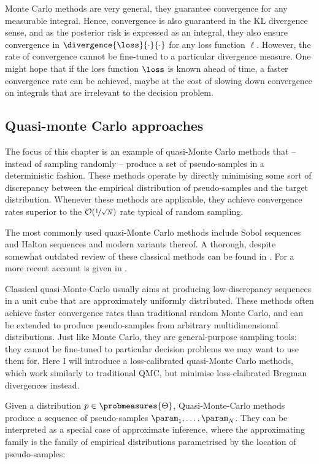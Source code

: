 Monte Carlo methods are very general, they guarantee convergence for any measurable integral. Hence, convergence is also guaranteed in the KL divergence sense, and as the posterior risk is expressed as an integral, they also ensure convergence in $\divergence{\loss}{\cdot}{\cdot}$ for any loss function $\ell$. However, the rate of convergence cannot be fine-tuned to a particular divergence measure. One might hope that if the loss function $\loss$ is known ahead of time, a faster convergence rate can be achieved, maybe at the cost of slowing down convergence on integrals that are irrelevant to the decision problem.

\subsection{Quasi-monte Carlo approaches}

The focus of this chapter is an example of quasi-Monte Carlo methods that -- instead of sampling randomly -- produce a set of pseudo-samples in a deterministic fashion. These methods operate by directly minimising some sort of discrepancy between the empirical distribution of pseudo-samples and the target distribution. Whenever these methods are applicable, they achieve convergence rates superior to the $\mathcal{O}(\nicefrac{1}{\sqrt{N}})$ rate typical of random sampling.

The most commonly used quasi-Monte Carlo methods include Sobol sequences \citep{Sobol1967,Sobol1998} and Halton sequences \citep{Halton1964} and modern variants thereof. A thorough, despite somewhat outdated review of these classical methods can be found in \citep{Niederreiter1992}. For a more recent account is given in \citep{Lemieux2009}.

Classical quasi-Monte-Carlo usually aims at producing low-discrepancy sequences in a unit cube that are approximately uniformly distributed. These methods often achieve faster convergence rates than traditional random Monte Carlo, and can be extended to produce pseudo-samples from arbitrary multidimensional distributions. Just like Monte Carlo, they are general-purpose sampling tools: they cannot be fine-tuned to particular decision problems we may want to use them for. Here I will introduce a loss-calibrated quasi-Monte Carlo methods, which work similarly to traditional QMC, but minimise loss-claibrated Bregman divergences instead.

Given a distribution $p\in\probmeasures{\Theta}$, Quasi-Monte-Carlo methods produce a sequence of pseudo-samples $\param_1,\ldots,\param_N$. They can be interpreted as a special case of approximate inference, where the approximating family is the family of empirical distributions parametrised by the location of pseudo-samples:

